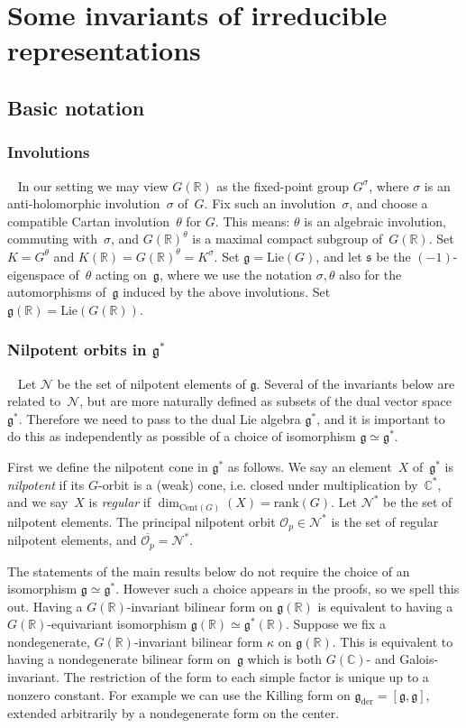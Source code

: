 \documentclass[cupthm]{CUP-JNL-JMJ}
\numberwithin{equation}{section}
\theoremstyle{cupplain}
\theoremstyle{cupdefinition}
\theoremstyle{cupremark}
\theoremstyle{cupproof}
\newcommand{\Cent}{\mathrm{Cent}}
\renewcommand{\O}{\mathcal O}
\newcommand{\R}{\mathbb R}
\newcommand{\C}{\mathbb C}
\newcommand{\N}{\mathcal N}
\newcommand{\Lie}{\mathrm{Lie}}
\newcommand{\g}{\mathfrak g}
\newcommand{\gder}{\mathfrak g_{\mathrm{der}}}
\newcommand{\s}{\mathfrak s}
\begin{document}
\section{Some invariants of irreducible representations}

\subsection{Basic notation}

\subsubsection{Involutions}~
 In our setting we may view $G(\R)$ as the fixed-point group $G^\sigma$, where $\sigma$ is an anti-holomorphic involution~$\sigma$ of~$G$. Fix such an involution~$\sigma$, and choose a compatible Cartan involution~$\theta$ for $G$. This means:
$\theta$ is an algebraic involution, commuting with~$\sigma$,
and $G(\R)^\theta$ is a maximal compact subgroup of~$G(\R)$. Set $K=G^\theta$ and $K(\R)=G(\R)^\theta=K^\sigma$.
Set $\g=\Lie(G)$, and let $\s$ be the $(-1)$-eigenspace of~$\theta$ acting on~$\g$, where we use the notation $\sigma, \theta$ also for the automorphisms of~$\g$ induced by the above involutions. Set $\g(\R)=\Lie(G(\R))$.

\subsubsection{Nilpotent orbits in $\g^*$}~
\label{s:dual}
Let $\N$ be the set of nilpotent elements of $\g$. Several of the invariants below are related to~$\N$, but are more naturally defined as subsets of the dual vector space~$\g^\ast$.
Therefore we need to pass to the dual Lie algebra $\g^*$, and it is important to do this as independently as possible of a choice
of isomorphism $\g\simeq\g^*$. 

First we define the nilpotent cone in $\g^*$ as follows. 
We say an element~$X$ of~$\g^*$ is \emph{nilpotent} if its $G$-orbit is a (weak) cone, i.e. closed under multiplication by~$\C^*$,
and we say~$X$ is \emph{regular} if $\dim_{\Cent(G)}(X)=\mathrm{rank}(G)$.
Let $\N^*$ be the set of nilpotent elements.
The principal nilpotent orbit $\O_p\in \N^*$ is the set of regular nilpotent elements, and $\overline{\O_p}=\N^*$.

The statements of the main results below do not require the choice of an isomorphism $\g\simeq \g^*$. However such a choice appears in the proofs, so we spell this out.
Having a $G(\R)$-invariant bilinear form on $\g(\R)$ is equivalent to having a $G(\R)$-equivariant isomorphism $\g(\R)\simeq \g^*(\R)$. 
Suppose we fix a nondegenerate, $G(\R)$-invariant bilinear form $\kappa$ on $\g(\R)$. This is equivalent to having a nondegenerate bilinear form on~$\g$ which is both $G(\C)$- and Galois-invariant. The restriction of the form to each simple factor
is unique up to a nonzero constant. For example we can use the Killing form on $\gder=[\g, \g]$, extended arbitrarily by a nondegenerate form on the center.
\end{document}
